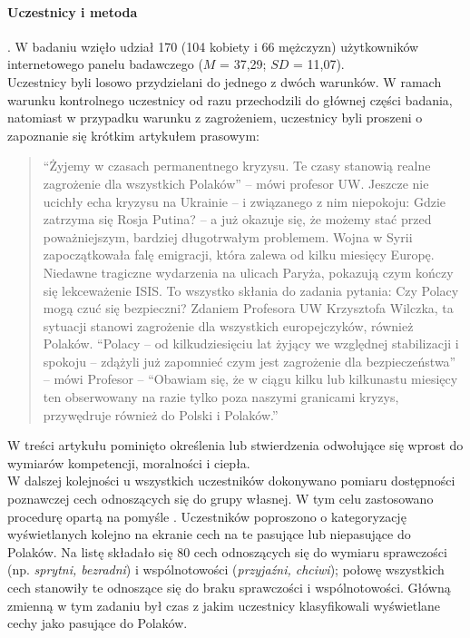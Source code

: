 \documentclass[man]{apa6}
\begin{document}
\paragraph{Uczestnicy i metoda}.
W badaniu wzięło udział 170 (104 kobiety i 66 mężczyzn) użytkowników internetowego panelu badawczego ($M$ = 37,29; $SD$ = 11,07).\\

Uczestnicy byli losowo przydzielani do jednego z dwóch warunków. W ramach warunku kontrolnego uczestnicy od razu przechodzili do głównej części badania, natomiast w przypadku warunku z zagrożeniem, uczestnicy byli proszeni o zapoznanie się krótkim artykułem prasowym:
\blockquote{``Żyjemy w czasach permanentnego kryzysu. Te czasy stanowią realne zagrożenie dla wszystkich Polaków'' -- mówi profesor UW. Jeszcze nie ucichły echa kryzysu na Ukrainie -- i związanego z nim niepokoju: Gdzie zatrzyma się Rosja Putina? -- a już okazuje się, że możemy stać przed poważniejszym, bardziej długotrwałym problemem. Wojna w Syrii zapoczątkowała falę emigracji, która zalewa od kilku miesięcy Europę. Niedawne tragiczne wydarzenia na ulicach Paryża, pokazują czym kończy się lekceważenie ISIS. To wszystko skłania do zadania pytania: Czy Polacy mogą czuć się bezpieczni? Zdaniem Profesora UW Krzysztofa Wilczka, ta sytuacji stanowi zagrożenie dla wszystkich europejczyków, również Polaków. ``Polacy -- od kilkudziesięciu lat żyjący we względnej stabilizacji i spokoju -- zdążyli już zapomnieć czym jest zagrożenie dla bezpieczeństwa'' -- mówi Profesor -- ``Obawiam się, że w ciągu kilku lub kilkunastu miesięcy ten obserwowany na razie tylko poza naszymi granicami kryzys, przywędruje również do Polski i Polaków.''}

W treści artykułu pominięto określenia lub stwierdzenia odwołujące się wprost do wymiarów kompetencji, moralności i ciepła.\\

W dalszej kolejności u wszystkich uczestników dokonywano pomiaru dostępności poznawczej cech odnoszących się do grupy własnej. W tym celu zastosowano procedurę opartą na pomyśle \textcite{dodgson1998self}. Uczestników poproszono o kategoryzację wyświetlanych kolejno na ekranie cech na te pasujące lub niepasujące do Polaków. Na listę składało się 80 cech odnoszących się do wymiaru sprawczości (np. \emph{sprytni, bezradni}) i wspólnotowości (\emph{przyjaźni, chciwi}); połowę wszystkich cech stanowiły te odnoszące się do braku sprawczości i wspólnotowości. Główną zmienną w tym zadaniu był czas z jakim uczestnicy klasyfikowali wyświetlane cechy jako pasujące do Polaków.
\end{document}
